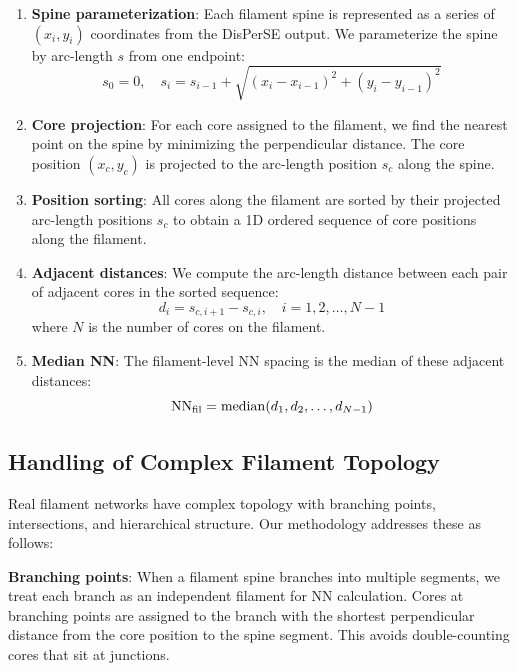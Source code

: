 \documentclass[twoside,twocolumn]{mnras}
\begin{document}
\begin{enumerate}
    \item \textbf{Spine parameterization}: Each filament spine is represented as a series of $(x_i, y_i)$ coordinates from the DisPerSE output. We parameterize the spine by arc-length $s$ from one endpoint:
    \begin{equation}
        s_0 = 0, \quad s_i = s_{i-1} + \sqrt{(x_i - x_{i-1})^2 + (y_i - y_{i-1})^2}
    \end{equation}

    \item \textbf{Core projection}: For each core assigned to the filament, we find the nearest point on the spine by minimizing the perpendicular distance. The core position $(x_c, y_c)$ is projected to the arc-length position $s_c$ along the spine.

    \item \textbf{Position sorting}: All cores along the filament are sorted by their projected arc-length positions $s_c$ to obtain a 1D ordered sequence of core positions along the filament.

    \item \textbf{Adjacent distances}: We compute the arc-length distance between each pair of adjacent cores in the sorted sequence:
    \begin{equation}
        d_i = s_{c,i+1} - s_{c,i}, \quad i = 1, 2, \ldots, N-1
    \end{equation}
    where $N$ is the number of cores on the filament.

    \item \textbf{Median NN}: The filament-level NN spacing is the median of these adjacent distances:
    \begin{equation}
        {\rm NN}_{\rm fil} = {\rm median}(d_1, d_2, \ldots, d_{N-1})
    \end{equation}
\end{enumerate}

\subsection{Handling of Complex Filament Topology}

Real filament networks have complex topology with branching points, intersections, and hierarchical structure. Our methodology addresses these as follows:

\textbf{Branching points}: When a filament spine branches into multiple segments, we treat each branch as an independent filament for NN calculation. Cores at branching points are assigned to the branch with the shortest perpendicular distance from the core position to the spine segment. This avoids double-counting cores that sit at junctions.
\end{document}
